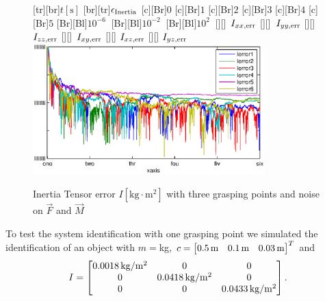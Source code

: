 \begin{figure}
	\centering	
	[tr][br]{$t\left[\mathrm{s}\right]$}
	[br][tr]{$\epsilon_{\mathrm{Inertia}}$}
	[Br]{$0$}
	[Br]{$1$}
	[Br]{$2$}
	[Br]{$3$}
	[Br]{$4$}
	[Br]{$5$}
	[Br][Bl]{$10^{-6}\  $}
	[Br][Bl]{$10^{-2}\  $}
	[Br][Bl]{$10^2\  $}
	[][]{\tiny \  $I_{xx,\mathrm{err}}$}
	[][]{\tiny \  $I_{yy,\mathrm{err}}$}
	[][]{\tiny \  $I_{zz,\mathrm{err}}$}
	[][]{\tiny \  $I_{xy,\mathrm{err}}$}
	[][]{\tiny \hspace{0.5cm} $I_{xz,\mathrm{err}}$}
	[][]{\tiny \hspace{0.5cm} $I_{yz,\mathrm{err}}$}
	\includegraphics[width=0.8\textwidth]{figures/inertia_multi_noise.eps}
	\vspace{0.2cm}
	\caption[Inertia Tensor error, three grasping points and noise]{Inertia Tensor error $I \left[\mathrm{kg} \cdot \mathrm{m}^2\right]$ with three grasping points and noise on $\vec F$ and $\vec M$}
	\label{fig:estim_inertia_multi_noise}
\end{figure}

To test the system identification with one grasping point we simulated the identification of an object with $m = $\unit[2]{kg}, $c = \begin{bmatrix} \text{\unit[0.5]{m}} & \text{\unit[0.1]{m}} & \text{\unit[0.03]{m}} \end{bmatrix}^T$ and 
\begin{equation*}
	I = \begin{bmatrix} \text{\unit[0.0018]{$\scr{kg}/\scr{m}^2$}} & 0 & 0 \\ 0 & \text{\unit[0.0418]{$\scr{kg}/\scr{m}^2$}} & 0 \\ 0 & 0 & \text{\unit[0.0433]{$\scr{kg}/\scr{m}^2$}} \end{bmatrix}.
\end{equation*}

